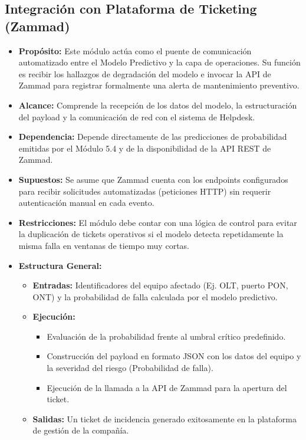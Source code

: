 \documentclass[12pt,a4paper]{article}
\begin{document}
    \subsection{Integración con Plataforma de Ticketing (Zammad)}
    \begin{itemize}
        \item \textbf{Propósito:} Este módulo actúa como el puente de comunicación automatizado entre el Modelo Predictivo y la capa de operaciones. Su función es recibir los hallazgos de degradación del modelo e invocar la API de Zammad para registrar formalmente una alerta de mantenimiento preventivo.
        \item \textbf{Alcance:} Comprende la recepción de los datos del modelo, la estructuración del payload y la comunicación de red con el sistema de Helpdesk.
        \item \textbf{Dependencia:} Depende directamente de las predicciones de probabilidad emitidas por el Módulo 5.4 y de la disponibilidad de la API REST de Zammad.
        \item \textbf{Supuestos:} Se asume que Zammad cuenta con los endpoints configurados para recibir solicitudes automatizadas (peticiones HTTP) sin requerir autenticación manual en cada evento.
        \item \textbf{Restricciones:} El módulo debe contar con una lógica de control para evitar la duplicación de tickets operativos si el modelo detecta repetidamente la misma falla en ventanas de tiempo muy cortas.
        \item \textbf{Estructura General:} 
        \begin{itemize}
            \item \textbf{Entradas:} Identificadores del equipo afectado (Ej. OLT, puerto PON, ONT) y la probabilidad de falla calculada por el modelo predictivo.
            \item \textbf{Ejecución: } 
            \begin{itemize}
                \item Evaluación de la probabilidad frente al umbral crítico predefinido.
                \item Construcción del payload en formato JSON con los datos del equipo y la severidad del riesgo (Probabilidad de falla).
                \item Ejecución de la llamada a la API de Zammad para la apertura del ticket.
            \end{itemize} 
            \item \textbf{Salidas:} Un ticket de incidencia generado exitosamente en la plataforma de gestión de la compañía.
        \end{itemize}
    \end{itemize}
\end{document}
